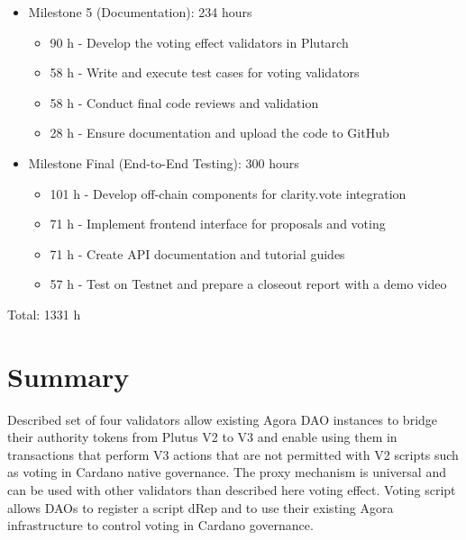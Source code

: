 \documentclass{article}
\begin{document}
\begin{itemize}
  \item Milestone 5 (Documentation): 234 hours
        \begin{itemize}
          \item 90 h - Develop the voting effect validators in Plutarch
          \item 58 h - Write and execute test cases for voting validators
          \item 58 h - Conduct final code reviews and validation
          \item 28 h - Ensure documentation and upload the code to GitHub
        \end{itemize}

  \item Milestone Final (End-to-End Testing): 300 hours
        \begin{itemize}
          \item 101 h - Develop off-chain components for clarity.vote integration
          \item 71 h - Implement frontend interface for proposals and voting
          \item 71 h - Create API documentation and tutorial guides
          \item 57 h - Test on Testnet and prepare a closeout report with a demo video
        \end{itemize}
\end{itemize}
Total: 1331 h

\section{Summary}

Described set of four validators allow existing Agora DAO instances to bridge their authority tokens from Plutus V2 to V3 and enable using them in transactions that perform V3 actions that are not permitted with V2 scripts such as voting in Cardano native governance.
The proxy mechanism is universal and can be used with other validators than described here voting effect.
Voting script allows DAOs to register a script dRep and to use their existing Agora infrastructure to control voting in Cardano governance.
\end{document}
